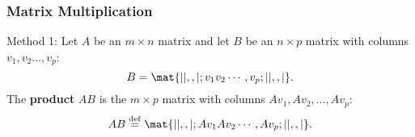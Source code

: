 

\usetikzlibrary{matrix,ipe}




\begin{frame}
\frametitle{Matrix Multiplication}

\alert{Method 1:}
Let $A$ be an $m\times n$ matrix and let $B$ be an
$n\times p$ matrix with columns $v_1,v_2\ldots,v_p$:
\[ B = \mat{| | ,, |; v_1 v_2 \cdots, v_p; | | ,, |}. \]
The \textbf{product} $AB$ is the $m\times p$ matrix with columns
$Av_1,Av_2,\ldots,Av_p$: 
\[ AB \overset{\rm def}=
\mat{| | ,, |; Av_1 Av_2 \cdots, Av_p; | | ,, |}. \]


\end{frame}
